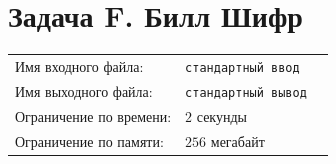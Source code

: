 \documentclass[12pt]{scrartcl}
\newcommand{\inputFile}{стандартный ввод}
\newcommand{\outputFile}{стандартный вывод}
\begin{document}
\newpage


\section*{Задача F. Билл Шифр }

\begin{tabularx}{\textwidth}{l l X}
    Имя входного файла: & \texttt{\inputFile} \\
    Имя выходного файла: & \texttt{\outputFile} \\
    Ограничение по времени: & $2$ секунды \\
    Ограничение по памяти: & $256$ мегабайт \\
\end{tabularx}

\begin{figure}[h]
\begin{minipage}[h]{0.3\linewidth}
\end{minipage}
\begin{minipage}[h]{0.3\linewidth}

\end{minipage}
\end{figure}
\end{document}

